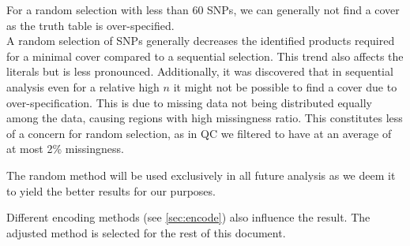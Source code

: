 \documentclass[letterpaper, 11pt]{article}
\begin{document}
\begin{figure}[!h] \end{figure}
For a random selection with less than 60 SNPs, we can generally not find a cover as the truth table is over-specified. \\

A random selection of SNPs generally decreases the identified products required for a minimal cover compared to a sequential selection. This trend also affects the literals but is less pronounced. Additionally, it was discovered that in sequential analysis even for a relative high $n$ it might not be possible to find a cover due to over-specification. This is due to missing data not being distributed equally among the data, causing regions with high missingness ratio. This constitutes less of a concern for random selection, as in QC we filtered to have at an average of at most 2\% missingness. 

The random method will be used exclusively in all future analysis as we deem it to yield the better results for our purposes. 


Different encoding methods (see \ref{sec:encode}) also influence the result. The adjusted method is selected for the rest of this document. 
\end{document}
